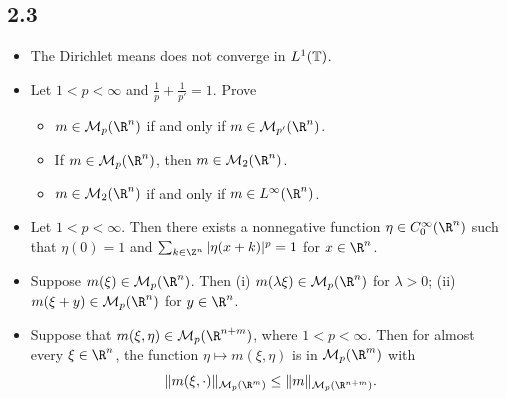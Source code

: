 \subsection*{2.3}
\begin{itemize}
    \item[1.]The Dirichlet means does not converge in $L^1(\mathbb{T})$.

    \item[2.]Let $1<p<\infty$ and $\frac{1}{p}+\frac{1}{p'}=1$. Prove
    \begin{itemize}
    \item[(i)]$m\in\mathcal{M}_p(\R^n)$ if and only if $m\in\mathcal{M}_{p'}(\R^n)$.

    \item[(ii)]If $m\in\mathcal{M}_p(\R^n)$, then $m\in\mathcal{M}_2(\R^n)$.

    \item[(iii)]$m\in\mathcal{M}_2(\R^n)$ if and only if $m\in L^\infty(\R^n)$.
    \end{itemize}

    \item[3.]Let $1<p<\infty$. Then there exists a nonnegative function 
    $\eta\in C_0^\infty(\R^n)$ such that $\eta(0)=1$ and 
    $\sum_{k\in\Z^n}|\eta(x+k)|^p=1$ for $x\in\R^n$.
    
    \item[4.]Suppose $m(\xi)\in\mathcal{M}_p(\R^n)$. Then 
    (i) $m(\lambda\xi)\in\mathcal{M}_p(\R^n)$ for $\lambda>0$;
    (ii) $m(\xi+y)\in\mathcal{M}_p(\R^n)$ for $y\in\R^n$.

    \item[5.]Suppose that $m(\xi,\eta)\in\mathcal{M}_p(\R^{n+m})$, 
    where $1<p<\infty$. Then for almost every $\xi\in\R^n$, the function 
    $\eta\mapsto m(\xi,\eta)$ is in $\mathcal{M}_p(\R^m)$ with
    $$\|m(\xi,\cdot)\|_{\mathcal{M}_p(\R^m)}\le\|m\|_{\mathcal{M}_p(\R^{n+m})}.$$

\end{itemize}
